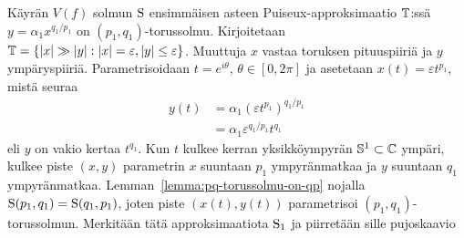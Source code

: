 \begin{esimerkki}
    \label{esim:1-aste-puiseux-solmu}
    Käyrän $V(f)$ solmun $\text{S}$ ensimmäisen asteen Puiseux-approksimaatio $\mathbb{T}$:ssä $y=\alpha_1x^{q_1/p_1}$ on $(p_1,q_1)$-torussolmu. Kirjoitetaan $\mathbb{T}=\{|x|\gg|y|:|x|=\varepsilon,|y|\leq\varepsilon\}$. Muuttuja $x$ vastaa toruksen pituuspiiriä ja $y$ ympäryspiiriä. Parametrisoidaan $t=e^{i\theta}$, $\theta\in[0,2\pi]$ ja asetetaan $x(t)=\varepsilon t^{p_1}$, mistä seuraa
    \begin{align*}
        y(t)&=\alpha_1(\varepsilon t^{p_1})^{q_1/p_1} \\
        &=\alpha_1\varepsilon^{q_1/p_1}t^{q_1}
    \end{align*}
    eli $y$ on vakio kertaa $t^{q_1}$. Kun $t$ kulkee kerran yksikköympyrän $\mathbb{S}^1\subset\mathbb{C}$ ympäri, kulkee piste $(x,y)$ parametrin $x$ suuntaan $p_1$ ympyränmatkaa ja $y$ suuntaan $q_1$ ympyränmatkaa. Lemman~\ref{lemma:pq-torussolmu-on-qp} nojalla $\text{S}(p_1,q_1)=\text{S}(q_1,p_1)$, joten piste $(x(t),y(t))$ parametrisoi $(p_1,q_1)$-torussolmun. Merkitään tätä approksimaatiota $\text{S}_1$ ja piirretään sille pujoskaavio
    \begin{center}
    \end{center}
\end{esimerkki}

